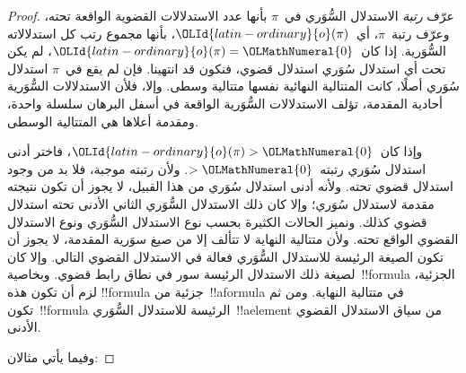 \documentclass[../../../include/open-logic-section]{subfiles}
\begin{document}
\begin{proof}
  عرّف \emph{رتبة} الاستدلال السُّوَري في~$\pi$ بأنها عدد الاستدلالات
  القضوية الواقعة تحته، وعرّف رتبة~$\pi$، أي~${\OLId{latin-ordinary}{o}}(\pi)$، بأنها مجموع رتب
  كل استدلالاته السُّوَرية. إذا كان~${\OLId{latin-ordinary}{o}}(\pi)={\OLMathNumeral{0}}$، لم يكن تحت أي استدلال
  سُوَري استدلال قضوي، فنكون قد انتهينا. فإن لم يقع في~$\pi$ استدلال
  سُوَري أصلًا، كانت المتتالية النهائية نفسها متتالية وسطى. وإلا، فلأن
  الاستدلالات السُّوَرية أحادية المقدمة، تؤلف الاستدلالات السُّوَرية
  الواقعة في أسفل البرهان سلسلة واحدة، ومقدمة أعلاها هي المتتالية الوسطى.

  وإذا كان~${\OLId{latin-ordinary}{o}}(\pi)>{\OLMathNumeral{0}}$، فاختر أدنى استدلال سُوَري رتبته~$>{\OLMathNumeral{0}}$. ولأن
  رتبته موجبة، فلا بد من وجود استدلال قضوي تحته. ولأنه أدنى استدلال
  سُوَري من هذا القبيل، لا يجوز أن تكون نتيجته مقدمة لاستدلال سُوَري؛
  وإلا كان ذلك الاستدلال السُّوَري الثاني الأدنى تحته استدلال قضوي
  كذلك. ونميز الحالات الكثيرة بحسب نوع الاستدلال السُّوَري ونوع
  الاستدلال القضوي الواقع تحته. ولأن متتالية النهاية لا تتألف إلا من
  صيغ سوَرية المقدمة، لا يجوز أن تكون الصيغة الرئيسة للاستدلال السُّوَري
  فعالة في الاستدلال القضوي التالي. وإلا كان لصيغة ذلك الاستدلال الرئيسة
  سور في نطاق رابط قضوي. وبخاصية~!!{formula} الجزئية، لزم أن تكون هذه
  !!{formula} جزئية من~!!a{formula} في متتالية النهاية. ومن ثم
  تكون~!!{formula} الرئيسة للاستدلال السُّوَري~!!a{element} من سياق
  الاستدلال القضوي الأدنى.

  وفيما يأتي مثالان:


\end{proof}
\end{document}

